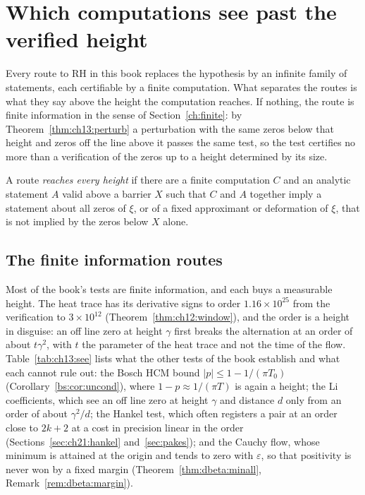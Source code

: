 \section{Which computations see past the verified height}\label{cp:sec:routes}

Every route to RH in this book replaces the hypothesis by an infinite family of statements, each certifiable by a finite computation. What separates the routes is what they say above the height the computation reaches. If nothing, the route is finite information in the sense of Section~\ref{ch:finite}: by Theorem~\ref{thm:ch13:perturb} a perturbation with the same zeros below that height and zeros off the line above it passes the same test, so the test certifies no more than a verification of the zeros up to a height determined by its size.

\begin{definition}\label{cp:def:reach}
A route \emph{reaches every height} if there are a finite computation $C$ and an analytic statement $A$ valid above a barrier $X$ such that $C$ and $A$ together imply a statement about all zeros of $\xi$, or of a fixed approximant or deformation of $\xi$, that is not implied by the zeros below $X$ alone.
\end{definition}

\subsection{The finite information routes}\label{cp:sec:finiteinfo}

Most of the book's tests are finite information, and each buys a measurable height. The heat trace has its derivative signs to order $1.16\times10^{25}$ from the verification to $3\times10^{12}$ (Theorem~\ref{thm:ch12:window}), and the order is a height in disguise: an off line zero at height $\gamma$ first breaks the alternation at an order of about $t\gamma^2$, with $t$ the parameter of the heat trace and not the time of the flow. Table~\ref{tab:ch13:see} lists what the other tests of the book establish and what each cannot rule out: the Bosch HCM bound $|p|\le1-1/(\pi T_0)$ (Corollary~\ref{bs:cor:uncond}), where $1-p\approx1/(\pi T)$ is again a height; the Li coefficients, which see an off line zero at height $\gamma$ and distance $d$ only from an order of about $\gamma^2/d$; the Hankel test, which often registers a pair at an order close to $2k+2$ at a cost in precision linear in the order (Sections~\ref{sec:ch21:hankel} and~\ref{sec:pakes}); and the Cauchy flow, whose minimum is attained at the origin and tends to zero with $\varepsilon$, so that positivity is never won by a fixed margin (Theorem~\ref{thm:dbeta:minall}, Remark~\ref{rem:dbeta:margin}).

